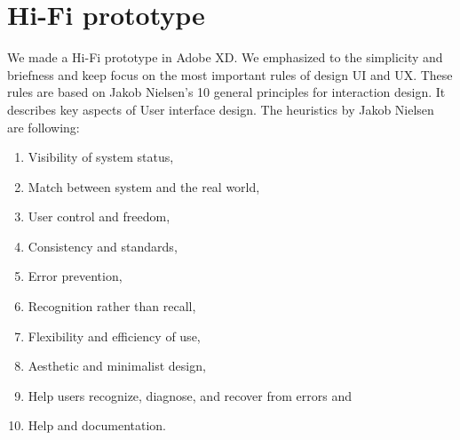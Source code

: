 \section{Hi-Fi prototype}\label{sec:hi-fi-prototype}
We made a Hi-Fi prototype in Adobe XD.
We emphasized to the simplicity and briefness and keep focus on the most important rules of design UI and UX.
These rules are based on Jakob Nielsen's 10 general principles for interaction design.\cite{nnGroup}
It describes key aspects of User interface design.
The heuristics by Jakob Nielsen are following:
\begin{enumerate}
    \item Visibility of system status,
    \item Match between system and the real world,
    \item User control and freedom,
    \item Consistency and standards,
    \item Error prevention,
    \item Recognition rather than recall,
    \item Flexibility and efficiency of use,
    \item Aesthetic and minimalist design,
    \item Help users recognize, diagnose, and recover from errors and
    \item Help and documentation.\cite{nnGroup}
\end{enumerate}















